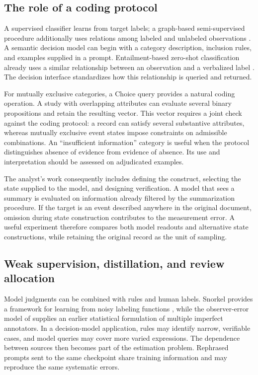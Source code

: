\documentclass[11pt,a4paper]{article}
\begin{document}
\subsection{The role of a coding protocol}

A supervised classifier learns from target labels; a graph-based semi-supervised procedure additionally uses relations among labeled and unlabeled observations \citep{zhu2003}. A semantic decision model can begin with a category description, inclusion rules, and examples supplied in a prompt. Entailment-based zero-shot classification already uses a similar relationship between an observation and a verbalized label \citep{yin2019}. The decision interface standardizes how this relationship is queried and returned.

For mutually exclusive categories, a Choice query provides a natural coding operation. A study with overlapping attributes can evaluate several binary propositions and retain the resulting vector. This vector requires a joint check against the coding protocol: a record can satisfy several substantive attributes, whereas mutually exclusive event states impose constraints on admissible combinations. An ``insufficient information'' category is useful when the protocol distinguishes absence of evidence from evidence of absence. Its use and interpretation should be assessed on adjudicated examples.

The analyst's work consequently includes defining the construct, selecting the state supplied to the model, and designing verification. A model that sees a summary is evaluated on information already filtered by the summarization procedure. If the target is an event described anywhere in the original document, omission during state construction contributes to the measurement error. A useful experiment therefore compares both model readouts and alternative state constructions, while retaining the original record as the unit of sampling.

\subsection{Weak supervision, distillation, and review allocation}

Model judgments can be combined with rules and human labels. Snorkel provides a framework for learning from noisy labeling functions \citep{ratner2017}, while the observer-error model of \citet{dawid1979} supplies an earlier statistical formulation of multiple imperfect annotators. In a decision-model application, rules may identify narrow, verifiable cases, and model queries may cover more varied expressions. The dependence between sources then becomes part of the estimation problem. Rephrased prompts sent to the same checkpoint share training information and may reproduce the same systematic errors.
\end{document}
